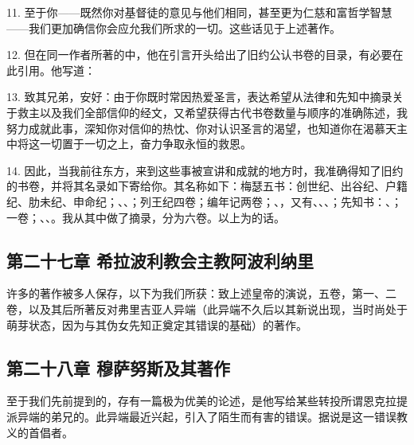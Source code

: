 11. 至于你——既然你对基督徒的意见与他们相同，甚至更为仁慈和富哲学智慧——我们更加确信你会应允我们所求的一切。这些话见于上述著作。\par

12. 但在同一作者所著的中，他在引言开头给出了旧约公认书卷的目录，有必要在此引用。他写道：\par

13. 致其兄弟，安好：由于你既时常因热爱圣言，表达希望从法律和先知中摘录关于救主以及我们全部信仰的经文，又希望获得古代书卷数量与顺序的准确陈述，我努力成就此事，深知你对信仰的热忱、你对认识圣言的渴望，也知道你在渴慕天主中将这一切置于一切之上，奋力争取永恒的救恩。\par

14. 因此，当我前往东方，来到这些事被宣讲和成就的地方时，我准确得知了旧约的书卷，并将其名录如下寄给你。其名称如下：梅瑟五书：创世纪、出谷纪、户籍纪、肋未纪、申命纪；、、；列王纪四卷；编年记两卷；、，又有、、、；先知书：、；一卷；、、。我从其中做了摘录，分为六卷。以上为的话。\par


\subsection{第二十七章  希拉波利教会主教阿波利纳里}

许多的著作被多人保存，以下为我们所获：致上述皇帝的演说，五卷，第一、二卷，以及其后所著反对弗里吉亚人异端（此异端不久后以其新说出现，当时尚处于萌芽状态，因为与其伪女先知正奠定其错误的基础）的著作。\par


\subsection{第二十八章  穆萨努斯及其著作}

至于我们先前提到的，存有一篇极为优美的论述，是他写给某些转投所谓恩克拉提派异端的弟兄的。此异端最近兴起，引入了陌生而有害的错误。据说是这一错误教义的首倡者。\par

